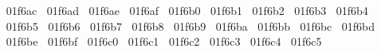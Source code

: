 {  ^^^^^^01f6ac%
  ^^^^^^01f6ad%
  ^^^^^^01f6ae%
  ^^^^^^01f6af%
  ^^^^^^01f6b0%
  ^^^^^^01f6b1%
  ^^^^^^01f6b2%
  ^^^^^^01f6b3%
  ^^^^^^01f6b4%
  ^^^^^^01f6b5%
  ^^^^^^01f6b6%
  ^^^^^^01f6b7%
  ^^^^^^01f6b8%
  ^^^^^^01f6b9%
  ^^^^^^01f6ba%
  ^^^^^^01f6bb%
  ^^^^^^01f6bc%
  ^^^^^^01f6bd%
  ^^^^^^01f6be%
  ^^^^^^01f6bf%
  ^^^^^^01f6c0%
  ^^^^^^01f6c1%
  ^^^^^^01f6c2%
  ^^^^^^01f6c3%
  ^^^^^^01f6c4%
  ^^^^^^01f6c5%
  ^^00}
\lst@RestoreCatcodes
\makeatother